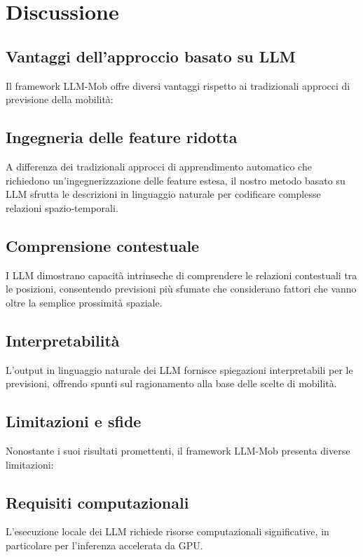 \chapter{Discussione}

\section{Vantaggi dell'approccio basato su LLM}

Il framework LLM-Mob offre diversi vantaggi rispetto ai tradizionali approcci di previsione della mobilità:

\section{Ingegneria delle feature ridotta}
A differenza dei tradizionali approcci di apprendimento automatico che richiedono un'ingegnerizzazione delle feature estesa, il nostro metodo basato su LLM sfrutta le descrizioni in linguaggio naturale per codificare complesse relazioni spazio-temporali.

\section{Comprensione contestuale}
I LLM dimostrano capacità intrinseche di comprendere le relazioni contestuali tra le posizioni, consentendo previsioni più sfumate che considerano fattori che vanno oltre la semplice prossimità spaziale.

\section{Interpretabilità}
L'output in linguaggio naturale dei LLM fornisce spiegazioni interpretabili per le previsioni, offrendo spunti sul ragionamento alla base delle scelte di mobilità.

\section{Limitazioni e sfide}

Nonostante i suoi risultati promettenti, il framework LLM-Mob presenta diverse limitazioni:

\section{Requisiti computazionali}
L'esecuzione locale dei LLM richiede risorse computazionali significative, in particolare per l'inferenza accelerata da GPU.

